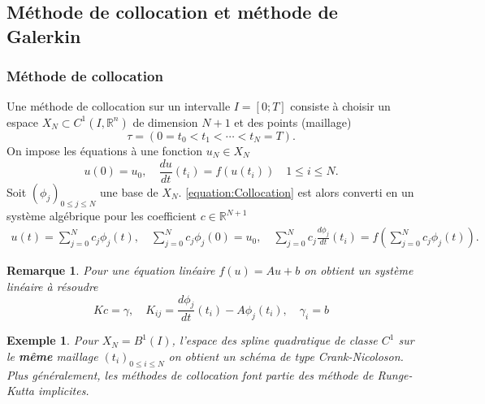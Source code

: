 \documentclass[11pt,a4paper, french]{article}
\newcommand{\R}{\mathbb R}
\newtheorem{remark}[theorem]{Remarque}
\newtheorem{example}[theorem]{Exemple}
\begin{document}
\subsection{Méthode de collocation et méthode de Galerkin}\label{subsec:}
%
\subsubsection{Méthode de collocation}

Une méthode de collocation sur un intervalle $I=[0;T]$ consiste à choisir un espace $X_N\subset C^1(I,\R^n)$ de dimension $N+1$ et des points (maillage)
%
\begin{equation}\label{equation:Mesh}
\tau = \left( 0 = t_0 < t_1 < \cdots < t_N = T\right).
\end{equation}
%
On impose les équations à une fonction $u_N\in X_N$
%
\begin{equation}\label{equation:Collocation}
u(0) = u_0,\quad \frac{du}{dt}(t_i) = f(u(t_i))\quad 1\le i\le N.
\end{equation}
%
Soit $(\phi_j)_{0\le j\le N}$ une base de $X_N$. \eqref{equation:Collocation} est alors converti en un système algébrique pour les coefficient $c\in\R^{N+1}$
\begin{align*}
u(t) = \sum_{j=0}^N c_j \phi_j(t),\quad \sum_{j=0}^N c_j \phi_j(0) = u_0,\quad \sum_{j=0}^N c_j\frac{d\phi_j}{dt}(t_i) = f(\sum_{j=0}^N c_j \phi_j(t)).
\end{align*}
%
%
\begin{remark}\label{remark:}
Pour une équation linéaire $f(u)=A u + b$ on obtient un système linéaire à résoudre
%
\begin{equation}\label{equation:}
K c = \gamma,\quad K_{ij} = \frac{d\phi_j}{dt}(t_i) - A\phi_j(t_i),\quad \gamma_i = b 
\end{equation}
%
\end{remark}
%
%
\begin{example}\label{example:}
Pour $X_N = B^1(I)$, l'espace des spline quadratique de classe $C^1$ sur le \textbf{même} maillage $(t_i)_{0\le i\le N}$ on obtient un schéma de type Crank-Nicoloson. Plus généralement, les méthodes de collocation font partie des méthode de Runge-Kutta implicites.
\end{example}
%
%
\end{document}
